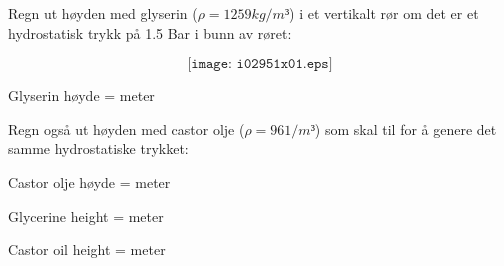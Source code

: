 

Regn ut høyden med glyserin ($\rho=1259kg/m³$) i et vertikalt rør om det er et hydrostatisk trykk på 1.5 Bar i bunn av røret:

$$\texttt{[image: i02951x01.eps]}$$

Glyserin høyde = \underbar{\hskip 50pt} meter 

\vskip 30pt

Regn også ut høyden med castor olje ($\rho=961/m³$) som skal til for å genere det samme hydrostatiske trykket:

\vskip 10pt

Castor olje høyde =  \underbar{\hskip 50pt} meter







Glycerine height =  meter

\vskip 10pt

Castor oil height =  meter










